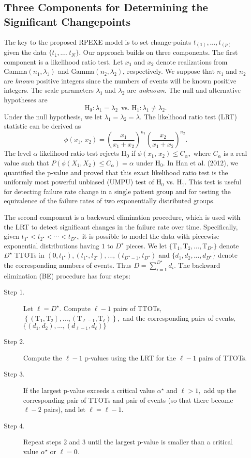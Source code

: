 \documentclass[12pt] {article}
\begin{document}
\subsection{Three Components for Determining the Significant Changepoints}
The key to the proposed RPEXE model is to set change-points
$t_{(1)},\ldots,t_{(p)}$ given the data $\{t_1,\ldots,t_N\}$.
Our approach builds on three components.
The first component is a likelihood ratio test.
Let $x_1$ and $x_2$ denote realizations from
Gamma$(n_1,\lambda_1)$ and Gamma$(n_2,\lambda_2)$, respectively.
We suppose that $n_1$ and $n_2$ are {\em known} positive integers
since the numbers of events will be known positive
integers.
The scale parameters $\lambda_1$ and $\lambda_2$ are {\em unknown}.
The null and alternative hypotheses are
$$
\textrm{H}_0:\lambda_1=\lambda_2\, \textrm{ vs. H}_1:\lambda_1 \neq \lambda_2.
$$
Under the null hypothesis, we let $\lambda_1=\lambda_2=\lambda.$
The likelihood ratio test (LRT) statistic can be derived as
$$\phi\left(x_{1},\, x_{2}\right) =
\left( \frac{x_{1}}{x_{1}+x_{2}}\right)^{n_1}
\left(\frac{x_2}{x_{1}+x_{2}}\right)^{n_2}.$$
The level $\alpha$ likelihood ratio test rejects H$_0$ if
$\phi\left(x_{1},\, x_{2}\right) \leq C_{\alpha},$
where $C_\alpha$ is a real value such that
$P\left( \phi(X_1,X_2) \leq C_\alpha \right)=\alpha$ under H$_0$.
In Han et al. (2012), we quantified the p-value
and proved that this exact likelihood ratio test is the
uniformly most powerful unbiased (UMPU) test of
H$_0$ vs. H$_1$. This test is useful for detecting
failure rate change in a single patient group and for
testing the equivalence of the failure rates
of two exponentially distributed groups.

The second component is a backward elimination procedure,
which is used with the LRT to detect significant changes
in the failure rate over time. Specifically, given
$t_{1^\star} < t_{2^\star} < \cdots < t_{D^\star},$
it is possible to model the data with piecewise exponential
distributions having $1$ to $D^\star$ pieces. We let $\{$T$_1,$T$_2,
\ldots,$T$_{D^\star}\}$
denote $D^\star$ TTOTs in $(0,t_{1^\star}),(t_{1^\star},t_{2^\star}),\ldots,
(t_{D^\star -1},t_{D^\star})$ and $\{d_1,d_2,\ldots,d_{D^\star}\}$
denote the corresponding numbers of events. Thus
$D=\sum_{i=1}^{D^\star} d_i.$ The backward elimination (BE)
procedure has four steps:
\begin{description}
\item[Step 1.] Let $\ell=D^\star.$ Compute $\ell-1$ pairs of
TTOTs, $\left\{(\textrm{T}_1,\textrm{T}_2),\ldots,
(\textrm{T}_{\ell-1},\textrm{T}_{\ell})\right\},$ and the
corresponding pairs of events, $\{(d_1,d_2),\ldots,(d_{\ell-1},d_\ell)\}$
\item[Step 2.] Compute the $\ell-1$ p-values using the LRT for the
$\ell-1$ pairs of TTOTs.
\item[Step 3.] If the largest p-value exceeds a critical value
$\alpha^\star$ and $\ell>1,$ add up the corresponding pair
of TTOTs and pair of events (so that there become $\ell-2$
pairs), and let $\ell=\ell-1$.
\item[Step 4.]
Repeat steps 2 and 3 until the largest p-value is smaller than a
critical value $\alpha^\star$ or $\ell=0.$
\end{description}
\end{document}
